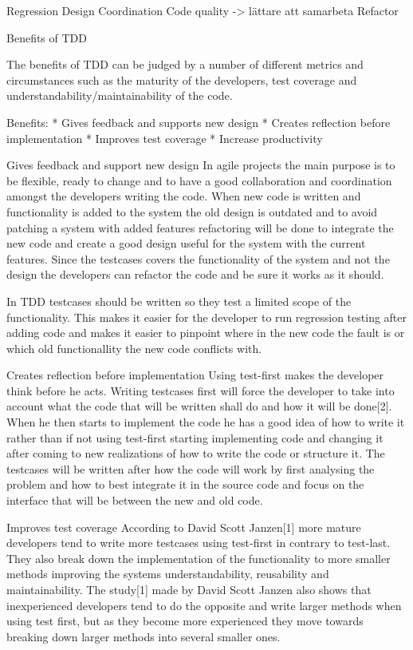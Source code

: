 
Regression
Design
Coordination
Code quality -> lättare att samarbeta
Refactor

Benefits of TDD

The benefits of TDD can be judged by a number of different metrics and circumstances such as the maturity of the developers, test coverage and understandability/maintainability of the code.

Benefits:
* Gives feedback and supports new design
* Creates reflection before implementation
* Improves test coverage
* Increase productivity

Gives feedback and support new design
In agile projects the main purpose is to be flexible, ready to change and to have a good collaboration and coordination amongst the developers writing the code. When new code is written and functionality is added to the system the old design is outdated and to avoid patching a system with added features refactoring will be done to integrate the new code and create a good design useful for the system with the current features. 
Since the testcases covers the functionality of the system and not the design the developers can refactor the code and be sure it works as it should. 

In TDD testcases should be written so they test a limited scope of the functionality. This makes it easier for the developer to run regression testing after adding code and makes it easier to pinpoint where in the new code the fault is or which old functionallity the new code conflicts with.

Creates reflection before implementation
Using test-first makes the developer think before he acts. Writing testcases first will force the developer to take into account what the code that will be written shall do and how it will be done[2]. When he then starts to implement the code he has a good idea of how to write it rather than if not using test-first starting implementing code and changing it after coming to new realizations of how to write the code or structure it. The testcases will be written after how the code will work by first analysing the problem and how to best integrate it in the source code and focus on the interface that will be between the new and old code.

Improves test coverage
According to David Scott Janzen[1] more mature developers tend to write more testcases using test-first in contrary to test-last. They also break down the implementation of the functionality to more smaller methods improving the systems understandability, reusability and maintainability. The study[1] made by David Scott Janzen also shows that inexperienced developers tend to do the opposite and write larger methods when using test first, but as they become more experienced they move towards breaking down larger methods into several smaller ones.

